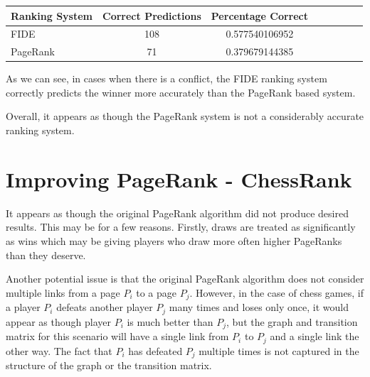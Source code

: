 \documentclass[pdftex,11pt,a4paper]{report}
\begin{document}
\begin{singlespace}
\begin{tabular}{l*{6}{c}r}
Ranking System & Correct Predictions & Percentage Correct \\ 
\hline

FIDE &  108 & 0.577540106952 \\
PageRank & 71 &  0.379679144385 \\

\end{tabular}
\end{singlespace}

As we can see, in cases when there is a conflict, the FIDE ranking system correctly predicts the winner
more accurately than the PageRank based system.


Overall, it appears as though the PageRank system is not a considerably accurate ranking system.


%
%










\chapter{Improving PageRank - ChessRank}

It appears as though the original PageRank algorithm did not produce desired results.
This may be for a few reasons. Firstly, draws are treated as significantly as wins
which may be giving players who draw more often higher PageRanks than they deserve.



Another potential issue is that the original PageRank algorithm does not consider
multiple links from a page $P_i$ to a page $P_j$. However, in the case of chess games,
if a player $P_i$ defeats another player $P_j$ many times and loses only once, it would
appear as though player $P_i$ is much better than $P_j$, but the graph and transition matrix
for this scenario will have a single link from $P_i$ to $P_j$ and a single link the other way.
The fact that $P_i$ has defeated $P_j$ multiple times is not captured in the structure of
the graph or the transition matrix.
\end{document}
